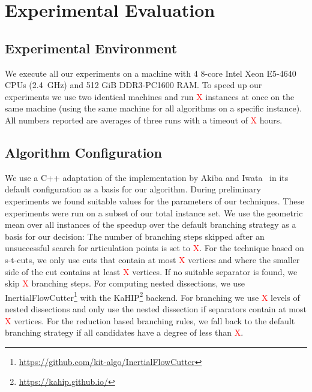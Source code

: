 \documentclass[a4paper,UKenglish,cleveref, autoref, thm-restate]{lipics-v2021}
\begin{document}

\section{Experimental Evaluation}

\subsection{Experimental Environment}
We execute all our experiments on a machine with 4 8-core Intel Xeon E5-4640 CPUs
(2.4~GHz) and 512 GiB DDR3-PC1600 RAM. To speed up our experiments we use two
identical machines and run \textcolor{red}{X} instances at once on the
same machine (using the same machine for all algorithms on a specific instance).
All numbers reported are averages  of three runs with
a timeout of \textcolor{red}{X} hours.

\subsection{Algorithm Configuration}
\label{sec:algo_conf}
We use a C++ adaptation of the implementation by Akiba and
Iwata~\cite{AkibaIwata} in its default configuration as a basis for our algorithm. During preliminary experiments we found
suitable values for the parameters of
our techniques. These experiments were run on a subset of our total instance
set. We use the geometric mean over all instances of the speedup over the
default branching strategy as a basis for our decision: The number of branching
steps skipped after an unsuccessful search for articulation points is set
to \textcolor{red}{X}. For the technique based on
s-t-cuts, we only use cuts that contain at most
\textcolor{red}{X} vertices and where the smaller side of
the cut contains at least \textcolor{red}{X} vertices.
If no suitable separator is found, we skip \textcolor{red}{X} branching steps. For computing nested dissections, we use 
InertialFlowCutter\footnote{\url{https://github.com/kit-algo/InertialFlowCutter}}
with the KaHIP\footnote{\url{https://kahip.github.io/}}
backend. For branching we use
\textcolor{red}{X} levels of nested dissections and
only use the nested dissection if separators contain at most
\textcolor{red}{X} vertices. For the reduction based
branching rules, we fall back to the default branching strategy if all
candidates have a degree of less than \textcolor{red}{X}.
\end{document}
